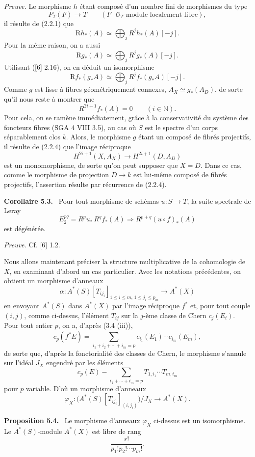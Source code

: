 \documentclass[11pt]{article}
\newenvironment{statement}[1]{\par\medskip\noindent\textbf{#1.}\ }{\par\medskip}
\begin{document}
\emph{Preuve.} Le morphisme $h$ étant composé d'un nombre fini de morphismes du type
\[
P_T(F)\to T\qquad (F\text{ }\mathcal O_T\text{-module localement libre}),
\]
il résulte de (2.2.1) que
\[
\mathrm Rh_*(A)\simeq\bigoplus_j R^jh_*(A)[-j].
\]
Pour la même raison, on a aussi
\[
\mathrm Rg_*(A)\simeq\bigoplus_j R^jg_*(A)[-j].
\]
Utilisant ([6] 2.16), on en déduit un isomorphisme
\[
\mathrm Rf_*(g_*A)\simeq\bigoplus_j R^j f_*(g_*A)[-j].
\]
Comme $g$ est lisse à fibres géométriquement connexes, $A_X\simeq g_*(A_D)$, de sorte qu'il nous reste à montrer que
\[
R^{2i+1}f_*(A)=0\qquad (i\in\mathbb N).
\tag{5.2.1}
\]
Pour cela, on se ramène immédiatement, grâce à la conservativité du système des foncteurs fibres (SGA 4 VIII 3.5), au cas où $S$ est le spectre d'un corps séparablement clos $k$. Alors, le morphisme $g$ étant un composé de fibrés projectifs, il résulte de (2.2.4) que l'image réciproque
\[
H^{2i+1}(X,A_X)\to H^{2i+1}(D,A_D)
\]
est un monomorphisme, de sorte qu'on peut supposer que $X=D$. Dans ce cas, comme le morphisme de projection $D\to k$ est lui-même composé de fibrés projectifs, l'assertion résulte par récurrence de (2.2.4).

\begin{statement}{Corollaire 5.3}
Pour tout morphisme de schémas $u:S\to T$, la suite spectrale de Leray
\[
E_2^{pq}=R^p u_*\,R^q f_*(A)\Rightarrow R^{p+q}(u\circ f)_*(A)
\]
est dégénérée.
\end{statement}

\emph{Preuve.} Cf. [6] 1.2.

Nous allons maintenant préciser la structure multiplicative de la cohomologie de $X$, en examinant d'abord un cas particulier. Avec les notations précédentes, on obtient un morphisme d'anneaux
\[
\alpha:A^*(S)[T_{ij_i}]_{1\le i\le m,\,1\le j_i\le p_m}\to A^*(X)
\]
en envoyant $A^*(S)$ dans $A^*(X)$ par l'image réciproque $f^*$ et, pour tout couple $(i,j)$, comme ci-dessus, l'élément $T_{ij}$ sur la $j$-ème classe de Chern $c_j(E_i)$. Pour tout entier $p$, on a, d'après (3.4 (iii)),
\[
c_p(f^*E)=\sum_{i_1+i_2+\cdots+i_m=p}c_{i_1}(E_1)\cdots c_{i_m}(E_m),
\]
de sorte que, d'après la fonctorialité des classes de Chern, le morphisme s'annule sur l'idéal $J_X$ engendré par les éléments
\[
c_p(E)-\sum_{i_1+\cdots+i_m=p}T_{1,i_1}\cdots T_{m,i_m}
\]
pour $p$ variable. D'où un morphisme d'anneaux
\[
\varphi_X:\bigl(A^*(S)[T_{ij_i}]_{(i,j_i)}\bigr)/J_X\to A^*(X).
\]

\begin{statement}{Proposition 5.4}
Le morphisme d'anneaux $\varphi_X$ ci-dessus est un isomorphisme. Le $A^*(S)$-module $A^*(X)$ est libre de rang
\[
\frac{r!}{p_1!p_2!\cdots p_m!}.
\]
\end{statement}
\end{document}
